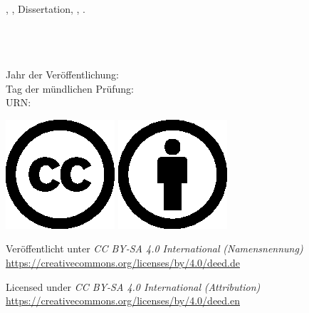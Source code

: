 

\thispagestyle{empty}

\ \vfill

\noindent%
\myName{}, \emph{\myTitle{}}, Dissertation, \myUni{}, \myYearPublication{}.

\bigskip

\begin{otherlanguage}{ngerman}

\noindent%
\myDepartmentDE{} \\
\myFacultyDE{} \\
\myUni{} \\
Jahr der Veröffentlichung: \myYearPublication{} \\
Tag der mündlichen Prüfung: \myTimePresent{} \\
URN:  \\

\bigskip

\noindent%
\includegraphics[height=4ex]{gfx/logos/creativecommons/cc}
\includegraphics[height=4ex]{gfx/logos/creativecommons/by}

\smallskip

\noindent%
Veröffentlicht unter \emph{CC BY-SA 4.0 International}
\emph{(Namensnennung)} \\
\url{https://creativecommons.org/licenses/by/4.0/deed.de}

\end{otherlanguage}

\smallskip

\noindent%
Licensed under \emph{CC BY-SA 4.0 International}
\emph{(Attribution)} \\
\url{https://creativecommons.org/licenses/by/4.0/deed.en}
